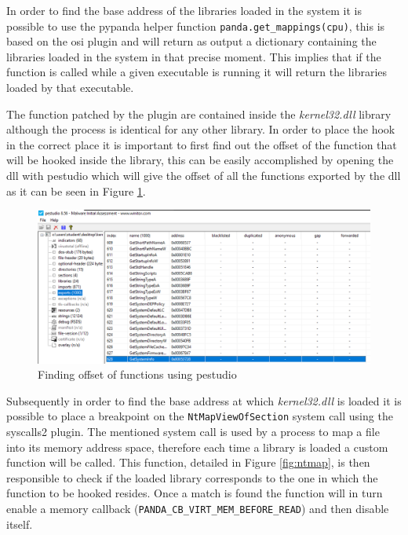 In order to find the base address of the libraries loaded in the system it is possible to use the pypanda helper function \lstinline{panda.get_mappings(cpu)}, this is based on the osi plugin and will return as output a dictionary containing the 
libraries loaded in the system in that precise moment. This implies that if the function is called while a given executable is running it will return the libraries loaded by that executable. 

The function patched by the plugin are contained inside the \textit{kernel32.dll} library although the process is identical for any other library. In order to place the hook in the correct place it is important to first find out the offset of the function that will be hooked inside the library, this can be easily accomplished by opening the dll with pestudio which will give the offset of all the functions exported by the dll as it can be seen in Figure \ref{fig:pestudio}. 

\noindent
\begin{figure}[htp]
\centering
\includegraphics[width=\linewidth]{images/pestudio.png}
\caption{Finding offset of functions using pestudio}
\label{fig:pestudio}
\end{figure}

Subsequently in order to find the base address at which \textit{kernel32.dll} is loaded it is possible to place a breakpoint on the \lstinline{NtMapViewOfSection} system call using the syscalls2 plugin. The mentioned system call is used by a process to map a file into its memory address space, therefore each time a library is loaded a custom function will be called. This function, detailed in Figure \ref{fig:ntmap}, is then responsible to check if the loaded library corresponds to the one in which the function to be hooked resides. Once a match is found the function will in turn enable a memory callback (\lstinline{PANDA_CB_VIRT_MEM_BEFORE_READ}) and then disable itself.

